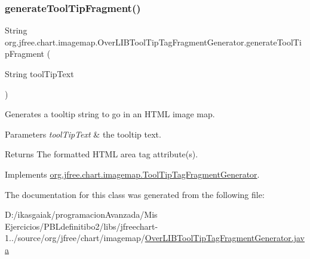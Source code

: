 \subsubsection{\texorpdfstring{generate\+Tool\+Tip\+Fragment()}{generateToolTipFragment()}}
{\footnotesize\ttfamily String org.\+jfree.\+chart.\+imagemap.\+Over\+L\+I\+B\+Tool\+Tip\+Tag\+Fragment\+Generator.\+generate\+Tool\+Tip\+Fragment (\begin{DoxyParamCaption}\item[{String}]{tool\+Tip\+Text }\end{DoxyParamCaption})}

Generates a tooltip string to go in an H\+T\+ML image map.


\begin{DoxyParams}{Parameters}
{\em tool\+Tip\+Text} & the tooltip text.\\
\hline
\end{DoxyParams}
\begin{DoxyReturn}{Returns}
The formatted H\+T\+ML area tag attribute(s). 
\end{DoxyReturn}


Implements \mbox{\hyperlink{interfaceorg_1_1jfree_1_1chart_1_1imagemap_1_1_tool_tip_tag_fragment_generator_a4e96c861b1fa7000056ed50c9ade7484}{org.\+jfree.\+chart.\+imagemap.\+Tool\+Tip\+Tag\+Fragment\+Generator}}.



The documentation for this class was generated from the following file\+:\begin{DoxyCompactItemize}
\item 
D\+:/ikasgaiak/programacion\+Avanzada/\+Mis Ejercicios/\+P\+B\+Ldefinitibo2/libs/jfreechart-\/1../source/org/jfree/chart/imagemap/\mbox{\hyperlink{_over_l_i_b_tool_tip_tag_fragment_generator_8java}{Over\+L\+I\+B\+Tool\+Tip\+Tag\+Fragment\+Generator.\+java}}\end{DoxyCompactItemize}
